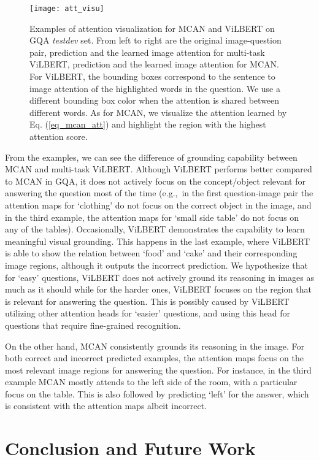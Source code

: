 \documentclass{article}
\begin{document}
\begin{figure}[!ht]
	\centering
	\texttt{[image: att\_visu]}
	\caption{Examples of attention visualization for MCAN and ViLBERT on GQA \textit{testdev} set. From left to right are the original image-question pair, prediction and the learned image attention for multi-task ViLBERT, prediction and the learned image attention for MCAN. For ViLBERT, the bounding boxes correspond to the sentence to image attention of the highlighted words in the question. We use a different bounding box color when the attention is shared between different words. As for MCAN, we visualize the attention learned by Eq. (\ref{eq_mcan_att}) and highlight the region with the highest attention score.}
	\label{fig:att_visu}
\end{figure}

From the examples, we can see the difference of grounding capability between MCAN and multi-task ViLBERT. Although ViLBERT performs better compared to MCAN in GQA, it does not actively focus on the concept/object relevant for answering the question most of the time (e.g.,\ in the first question-image pair the attention maps for `clothing' do not focus on the correct object in the image, and in the third example, the attention maps for `small side table' do not focus on any of the tables). Occasionally, ViLBERT demonstrates the capability to learn meaningful visual grounding. This happens in the last example, where ViLBERT is able to show the relation between `food' and `cake' and their corresponding image regions, although it outputs the incorrect prediction. We hypothesize that for `easy' questions, ViLBERT does not actively ground its reasoning in images as much as it should while for the harder ones, ViLBERT focuses on the region that is relevant for answering the question. This is possibly caused by ViLBERT utilizing other attention heads for `easier' questions, and using this head for questions that require fine-grained recognition.

On the other hand, MCAN consistently grounds its reasoning in the image. For both correct and incorrect predicted examples, the attention maps focus on the most relevant image regions for answering the question. For instance, in the third example MCAN mostly attends to the left side of the room, with a particular focus on the table. This is also followed by predicting `left' for the answer, which is consistent with the attention maps albeit incorrect.

\section{Conclusion and Future Work}
\end{document}

